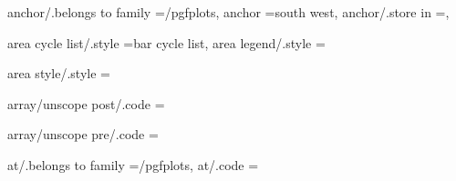 {anchor/.belongs to family                                          =/pgfplots,                                                                                                                         
anchor                                                             =south west,                                                                                                                        
anchor/.store in                                                   =\pgfplots@anchorname,                                                                                                              

area cycle list/.style                                             ={bar cycle list},                                                                                                                  
area legend/.style                                                 ={%
area style/.style                                                  ={%

array/unscope post/.code                                           ={%
array/unscope pre/.code                                            ={%

at/.belongs to family                                              =/pgfplots,                                                                                                                         
at/.code                                                           ={%

}}}}}}
